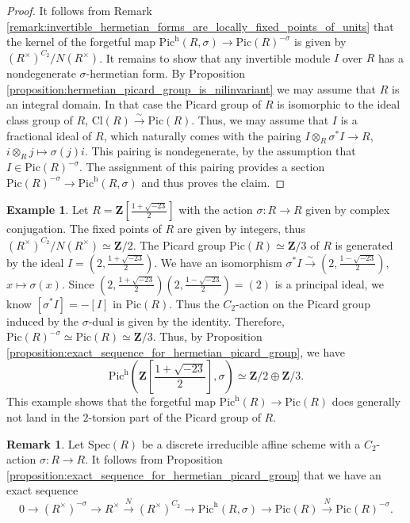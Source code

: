 \documentclass{article}
\theoremstyle{definition}
\newtheorem{remark}[equation]{Remark}
\newtheorem{example}[equation]{Example}
\begin{document}
\begin{proof}
    \label{proof:exact_sequence_for_hermetian_picard_group}
    It follows from Remark \ref{remark:invertible_hermetian_forms_are_locally_fixed_points_of_units} that the kernel of the forgetful map $\text{Pic}^\text{h}(R,\sigma)\rightarrow \text{Pic}(R)^{-\sigma}$ is given by $(R^\times)^{C_2}/N(R^\times)$. It remains to show that any invertible module $I$ over $R$ has a nondegenerate $\sigma$-hermetian form. By Proposition \ref{proposition:hermetian_picard_group_is_nilinvariant} we may assume that $R$ is an integral domain. In that case the Picard group of $R$ is isomorphic to the ideal class group of $R$, $\text{Cl}(R)\xrightarrow{\sim} \text{Pic}(R)$. Thus, we may assume that $I$ is a fractional ideal of $R$, which naturally comes with the pairing $I\otimes_R \sigma^* I\rightarrow R$, $i\otimes_R j\mapsto \sigma(j)i$. This pairing is nondegenerate, by the assumption that $I\in \text{Pic}(R)^{-\sigma}$. The assignment of this pairing provides a section $\text{Pic}(R)^{-\sigma}\rightarrow \text{Pic}^\text{h}(R,\sigma)$ and thus proves the claim.
\end{proof}

\begin{example}
    \label{example:hermetian_picard_group_does_not_map_to_2-torsion}
    Let $R=\mathbf{Z}[\frac{1+\sqrt{-23}}{2}]$ with the action $\sigma:R\rightarrow R$ given by complex conjugation. The fixed points of $R$ are given by integers, thus $(R^\times)^{C_2}/N(R^\times)\simeq \mathbf{Z}/2$. The Picard group $\text{Pic}(R)\simeq \mathbf{Z}/3$ of $R$ is generated by the ideal $I=(2,\frac{1+\sqrt{-23}}{2})$. We have an isomorphism $\sigma^* I\xrightarrow{\sim} (2,\frac{1-\sqrt{-23}}{2})$, $x\mapsto \sigma(x)$. Since $(2,\frac{1+\sqrt{-23}}{2})(2,\frac{1-\sqrt{-23}}{2})=(2)$ is a principal ideal, we know $[\sigma^*I]=-[I]$ in $\text{Pic}(R)$.  Thus the $C_2$-action on the Picard group induced by the $\sigma$-dual is given by the identity. Therefore, $\text{Pic}(R)^{-\sigma}\simeq \text{Pic}(R)\simeq \mathbf{Z}/3$. Thus, by Proposition \ref{proposition:exact_sequence_for_hermetian_picard_group}, we have $$\text{Pic}^\text{h}(\mathbf{Z}[\frac{1+\sqrt{-23}}{2}],\sigma)\simeq \mathbf{Z}/2\oplus\mathbf{Z}/3.$$ This example shows that the forgetful map $\text{Pic}^\text{h}(R)\rightarrow \text{Pic}(R)$ does generally not land in the $2$-torsion part of the Picard group of $R$.
\end{example}

\begin{remark}
    \label{remark:hermetian_picard_group_is_C_2-motivic_cohomology_in_degree_(2,1)}
    Let $\text{Spec}(R)$ be a discrete irreducible affine scheme with a $C_2$-action $\sigma:R\rightarrow R$. It follows from Proposition \ref{proposition:exact_sequence_for_hermetian_picard_group} that we have an exact sequence $$0\rightarrow (R^\times)^{-\sigma}\rightarrow R^\times \xrightarrow{N}( R^\times)^{C_2}\rightarrow\text{Pic}^\text{h}(R,\sigma)\rightarrow \text{Pic}(R)\xrightarrow{N} \text{Pic}(R)^{-\sigma}.$$
\end{remark}
\end{document}
